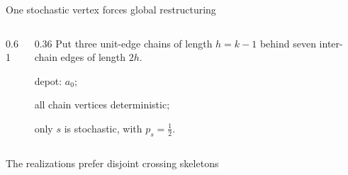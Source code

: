 \documentclass[aspectratio=169,12pt]{beamer}
\newcommand{\1}{\mathbf{1}}
\begin{document}
\begin{frame}{One stochastic vertex forces global restructuring}
  \begin{columns}[T,onlytextwidth]
    \begin{column}{0.61\textwidth}
      \centering
      \resizebox{0.96\linewidth}{!}{\StThreeChain}
    \end{column}
    \begin{column}{0.36\textwidth}
      Put three unit-edge chains of length \(h=k-1\) behind seven inter-chain
      edges of length \(2h\).

      \vspace{0.38cm}
      \begin{sttightitemize}
        \item depot: \(a_0\);
        \item all chain vertices deterministic;
        \item only \(s\) is stochastic, with \(p_s=\tfrac12\).
      \end{sttightitemize}

      \vspace{0.28cm}
    \end{column}
  \end{columns}
\end{frame}

\begin{frame}{The realizations prefer disjoint crossing skeletons}
  \centering
  \resizebox{0.79\linewidth}{!}{\StSkeletonComparison}

  \vspace{0.02cm}
  {\small
  }
\end{frame}
\end{document}
